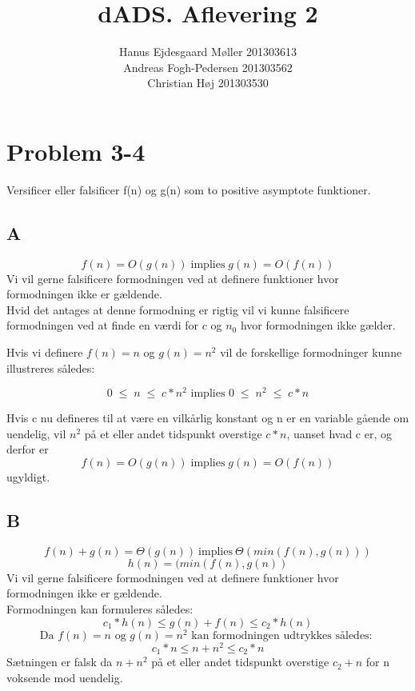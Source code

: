 \documentclass{article}
\title{dADS. Aflevering 2}
\author{
	Hanus Ejdesgaard Møller 201303613 \\
	Andreas Fogh-Pedersen 201303562 \\
	Christian Høj 201303530
}
\begin{document}
\maketitle
\section{Problem 3-4}
Versificer eller falsificer f(n) og g(n) som to positive asymptote funktioner.
	\subsection{A}
		\[ f(n)=O(g(n)) \; \text{implies} \; g(n)=O(f(n)) \]
			Vi vil gerne falsificere formodningen ved at definere funktioner hvor formodningen ikke er gældende.\\
			Hvid det antages at denne formodning er rigtig vil vi kunne falsificere formodningen ved at finde en værdi for $ c $ og $ n_0 $ hvor formodningen ikke gælder.
				
		Hvis vi definere $ f(n)=n $ og $ g(n)=n^2 $ vil de forskellige formodninger kunne illustreres således:
		
			\[ 0 \; \leq \; n \; \leq \; c*n^2 \text{ implies } 0 \; \leq \; n^2 \; \leq \; c*n \]
			
		Hvis c nu defineres til at være en vilkårlig konstant og n er en variable gående om uendelig, vil $ n^2 $ på et eller andet tidspunkt overstige $ c*n $, uanset hvad c er, og derfor er
		\[ f(n)=O(g(n)) \; \text{implies} \; g(n)=O(f(n)) \]
		ugyldigt.
				
	\subsection{B}
		\[ f(n)+g(n)=\Theta (g(n)) \: \text{implies} \: \Theta(min(f(n),g(n))) \]
		\[ h(n)=(min(f(n),g(n)) \]
		Vi vil gerne falsificere formodningen ved at definere funktioner hvor formodningen ikke er gældende.\\
		Formodningen kan formuleres således:
				\[ c_1*h(n) \leq g(n)+f(n) \leq c_2*h(n) \]
		\[ \text{Da } f(n)=n \text{ og } g(n)=n^2  \text{ kan formodningen udtrykkes således: } \] 
		\[ c_1*n \leq n+n^2 \leq c_2*n  \]
			Sætningen er falsk da $ n+n^2 $ på et eller andet tidspunkt overstige $ c_2+n $ for n voksende mod uendelig.
			
\end{document}
